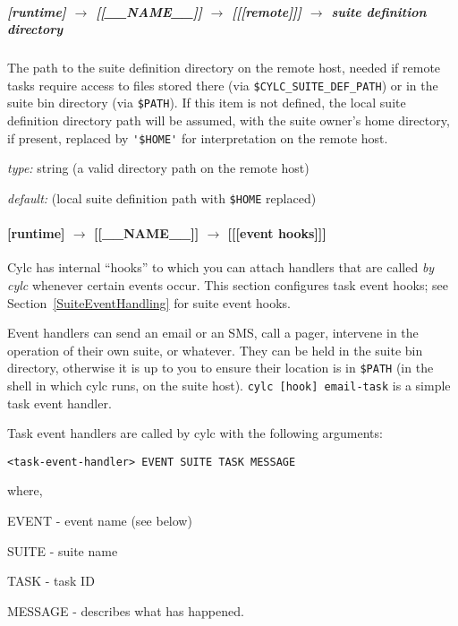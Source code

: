 \subparagraph[suite definition directory]{[runtime] $\rightarrow$ [[\_\_NAME\_\_]] $\rightarrow$ [[[remote]]] $\rightarrow$  suite definition directory}

The path to the suite definition directory on the remote host, needed if
remote tasks require access to files stored there (via
\lstinline=$CYLC_SUITE_DEF_PATH=) or in the suite bin directory (via
\lstinline=$PATH=).  If this item is not defined, the local suite
definition directory path will be assumed, with the suite owner's home
directory, if present, replaced by \lstinline='$HOME'= for
interpretation on the remote host. 

\begin{myitemize}
\item {\em type:} string (a valid directory path on the remote host)
\item {\em default:} (local suite definition path with \lstinline=$HOME=
    replaced)
\end{myitemize}
 

\paragraph[{[[[}event hooks{]]]}]{[runtime] $\rightarrow$ [[\_\_NAME\_\_]] $\rightarrow$ [[[event hooks]]]}
\label{TaskEventHandling}

Cylc has internal ``hooks'' to which you can attach handlers that are 
called {\em by cylc} whenever certain events occur. This section
configures task event hooks; see Section~\ref{SuiteEventHandling} for
suite event hooks.

Event handlers can send an email or an SMS, call a pager, intervene
in the operation of their own suite, or whatever.
They can be held in the suite bin directory, otherwise it is up to you
to ensure their location is in \lstinline=$PATH= (in the shell in which
cylc runs, on the suite host).
\lstinline=cylc [hook] email-task= is a simple task event handler. 

Task event handlers are called by cylc with the following arguments:
\begin{lstlisting}
<task-event-handler> EVENT SUITE TASK MESSAGE
\end{lstlisting}
where,
\begin{myitemize}
    \item EVENT - event name (see below)
    \item SUITE - suite name
    \item TASK  - task ID
    \item MESSAGE - describes what has happened.
\end{myitemize}

